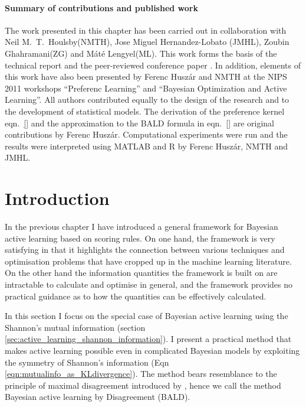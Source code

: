 

\paragraph{Summary of contributions and published work} The work presented in this chapter has been carried out in collaboration with Neil M.\ T.\ Houlsby(NMTH), Jose Miguel Hernandez-Lobato (JMHL), Zoubin Ghahramani(ZG) and M\'{a}t\'{e} Lengyel(ML). This work forms the basis of the technical report \citep{ArxivBALD} and the peer-reviewed conference paper \citep{NIPS2012}. In addition, elements of this work have also been presented by Ferenc Husz\'{a}r and NMTH at the NIPS 2011 workshops ``Preferenc Learning'' and ``Bayesian Optimization and Active Learning''. All authors contributed equally to the design of the research and to the development of statistical models. The derivation of the preference kernel eqn.\ \eqref{} and the approximation to the BALD formula in eqn.\ \eqref{} are original contributions by Ferenc Husz\'{a}r. Computational experiments were run and the results were interpreted using MATLAB and R by Ferenc Husz\'{a}r, NMTH and JMHL.

\section{Introduction}

In the previous chapter I have introduced a general framework for Bayesian active learning based on scoring rules. On one hand, the framework is very satisfying in that it highlights the connection between various techniques and optimisation problems that have cropped up in the machine learning literature. On the other hand the information quantities the framework is built on are intractable to calculate and optimise in general, and the framework provides no practical guidance as to how the quantities can be effectively calculated.

In this section I focus on the special case of Bayesian active learning using the Shannon's mutual information (section \ref{sec:active_learning_shannon_information}). I present a practical method that makes active learning possible even in complicated Bayesian models by exploiting the symmetry of Shannon's information (Eqn \eqref{eqn:mutualinfo_as_KLdivergence}). The method bears resemblance to the principle of maximal disagreement introduced by \citet{seung1992}, hence we call the method Bayesian active learning by Disagreement (BALD).

